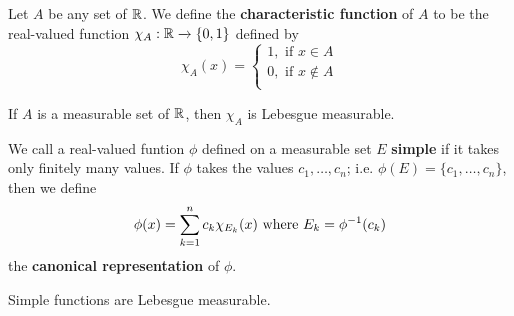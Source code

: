 \begin{definition}
    Let $A$ be any set of  $\mathbb{R}$. We define the  \textbf{characteristic function}
    of $A$ to be the real-valued function  $\chi_A:\mathbb{R} \xrightarrow{} \{0,1\}$
    defined by
    \begin{equation*}
        \chi_A(x)=  \begin{cases}
                     1, \text{ if } x \in A \\
                     0, \text{ if } x \notin A \\
                 \end{cases}
    \end{equation*}
\end{definition}

\begin{lemma}\label{9.2.2}
    If $A$ is a measurable set of  $\mathbb{R}$, then  $\chi_A$ is Lebesgue measurable.
\end{lemma}

\begin{definition}
    We call a real-valued funtion $\phi$ defined on a measurable set $E$
    \textbf{simple} if it takes only finitely many values. If $\phi$ takes the
    values $c_1, \dots, c_n$; i.e. $\phi(E)=\{c_1, \dots, c_n\}$, then we define
    \begin{equation*}
        \phi(x)=\sum_{k=1}^n{c_k\chi_{E_k}(x)} \text{ where } E_k=\phi^{-1}(c_k)
    \end{equation*}
    the \textbf{canonical representation} of $\phi$.
\end{definition}

\begin{lemma}\label{9.2.3}
    Simple functions are Lebesgue measurable.
\end{lemma}

